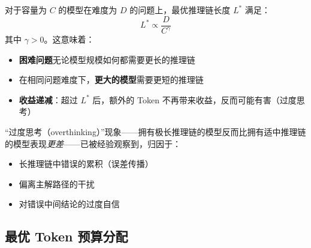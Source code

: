 \begin{keybox}[推理链长度与模型容量]
对于容量为 $C$ 的模型在难度为 $D$ 的问题上，最优推理链长度 $L^*$ 满足：
\begin{equation}
    L^* \propto \frac{D}{C^{\gamma}}
\end{equation}
其中 $\gamma > 0$。这意味着：

\begin{itemize}
  \item \textbf{困难问题}无论模型规模如何都需要更长的推理链
  \item 在相同问题难度下，\textbf{更大的模型}需要更短的推理链
  \item \textbf{收益递减}：超过 $L^*$ 后，额外的 Token 不再带来收益，反而可能有害（过度思考）
\end{itemize}
\end{keybox}

“过度思考（overthinking）”现象——拥有极长推理链的模型反而比拥有适中推理链的模型表现\emph{更差}——已被经验观察到，归因于：

\begin{itemize}
  \item 长推理链中错误的累积（误差传播）
  \item 偏离主解路径的干扰
  \item 对错误中间结论的过度自信
\end{itemize}

\subsection{最优 Token 预算分配}
\label{optimal-token-budget-allocation}

